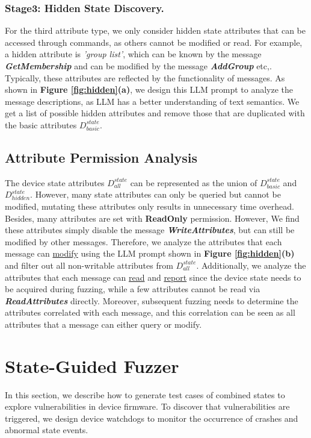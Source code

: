 \documentclass[10pt,journal,compsoc]{IEEEtran}
\begin{document}
\subsubsection{Stage3: Hidden State Discovery.} For the third attribute type, we only consider hidden state attributes that can be accessed through commands, as others cannot be modified or read. For example, a hidden attribute is \textit{'group list'}, which can be known by the message \textit{\textbf{GetMembership}} and can be modified by the message \textit{\textbf{AddGroup}} etc,. Typically, these attributes are reflected by the functionality of messages. As shown in \textbf{Figure \ref{fig:hidden}(a)}, we design this LLM prompt to analyze the message descriptions, as LLM has a better understanding of text semantics. We get a list of possible hidden attributes and remove those that are duplicated with the basic attributes $D_{basic}^{state}$.

\subsection{Attribute Permission Analysis} \label{5-2}
The device state attributes $D_{all}^{state}$ can be represented as the union of $D_{basic}^{state}$ and $D_{hidden}^{state}$. However, many state attributes can only be queried but cannot be modified, mutating these attributes only results in unnecessary time overhead. Besides, many attributes are set with \textbf{ReadOnly} permission. However, We find these attributes simply disable the message \textbf{\textit{WriteAttributes}}, but can still be modified by other messages. Therefore, we analyze the attributes that each message can \underline{modify} using the LLM prompt shown in \textbf{Figure \ref{fig:hidden}(b)} and filter out all non-writable attributes from $D_{all}^{state}$. Additionally, we analyze the attributes that each message can \underline{read} and \underline{report} since the device state needs to be acquired during fuzzing, while a few attributes cannot be read via \textbf{\textit{ReadAttributes}} directly. Moreover, subsequent fuzzing needs to determine the attributes correlated with each message, and this correlation can be seen as all attributes that a message can either query or modify.

\section{State-Guided Fuzzer} \label{6}

In this section, we describe how to generate test cases of combined states to explore vulnerabilities in device firmware. To discover that vulnerabilities are triggered, we design device watchdogs to monitor the occurrence of crashes and abnormal state events.
\end{document}
